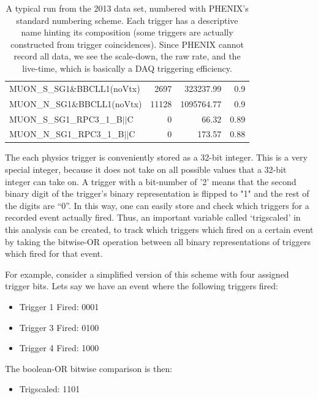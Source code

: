 \begin{table}
{\begin{tabular}{lrrr}
      MUON\_S\_SG1\&BBCLL1(noVtx) & 2697 & 323237.99 & 0.9 \\
      MUON\_N\_SG1\&BBCLL1(noVtx) & 11128 & 1095764.77 & 0.9 \\
      MUON\_S\_SG1\_RPC3\_1\_B$\vert\vert$C & 0 & 66.32 & 0.89 \\
      MUON\_N\_SG1\_RPC3\_1\_B$\vert\vert$C & 0 & 173.57 & 0.88 \\
      \bottomrule
    \end{tabular}
  }
  \caption{
    A typical run from the 2013 data set, numbered with PHENIX's standard
    numbering scheme. Each trigger has a descriptive name hinting its
    composition (some triggers are actually constructed from trigger 
    coincidences). Since PHENIX cannot record all data, we see the scale-down,
    the raw rate, and the live-time, which is basically a DAQ triggering
    efficiency.
  }
  \label{tab:typical_run}
\end{table}

The each physics trigger is conveniently stored as a 32-bit integer. This is a
very special integer, because it does not take on all possible values that a
32-bit integer can take on. A trigger with a bit-number of '2' means that the
second binary digit of the trigger's binary representation is flipped to "1" and
the rest of the digits are ``0''. In this way, one can easily store and check
which triggers for a recorded event actually fired. Thus, an important variable
called `trigscaled' in this analysis can be created, to track which triggers
which fired on a certain event by taking the bitwise-OR operation between all
binary representations of triggers which fired for that event.

For example, consider a simplified version of this scheme with four assigned
trigger bits. Lets say we have an event where the following triggers fired:

\begin{itemize}
    \item Trigger 1 Fired: 0001
    \item Trigger 3 Fired: 0100
    \item Trigger 4 Fired: 1000
\end{itemize}

The boolean-OR bitwise comparison is then:

\begin{itemize}
  \item Trigscaled: 1101
\end{itemize}

